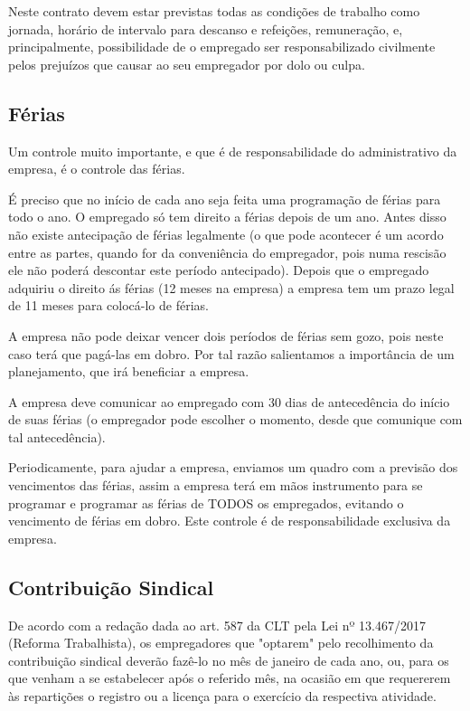 \documentclass{article}
\begin{document}
Neste contrato devem estar previstas todas as condições de trabalho como jornada, horário de intervalo para descanso e refeições, remuneração, e, principalmente, possibilidade de o empregado ser responsabilizado civilmente pelos prejuízos que causar ao seu empregador por dolo ou culpa.

\subsection{Férias}
Um controle muito importante, e que é de responsabilidade do administrativo da empresa, é o controle das férias. 

É preciso que no início de cada ano seja feita uma programação de férias para todo o ano. O empregado só tem direito a férias depois de um ano. Antes disso não existe antecipação de férias legalmente (o que pode acontecer é um acordo entre as partes, quando for da conveniência do empregador, pois numa rescisão ele não poderá descontar este período antecipado).  Depois que o empregado adquiriu o direito ás férias (12 meses na empresa) a empresa tem um prazo legal de 11 meses para colocá-lo de férias.  

A empresa não pode deixar vencer dois períodos de férias sem gozo, pois neste caso terá que pagá-las em dobro. Por tal razão salientamos a importância de um planejamento, que irá beneficiar a empresa. 

A empresa deve comunicar ao empregado com 30 dias de antecedência do início de suas férias (o empregador pode escolher o momento, desde que comunique com tal antecedência).

\begin{tcolorbox}[title=Atenção!]
  Periodicamente, para ajudar a empresa, enviamos um quadro com a previsão dos vencimentos das férias, assim a empresa terá em mãos instrumento para se programar e programar as férias de TODOS os empregados, evitando o vencimento de férias em dobro. Este controle é de responsabilidade exclusiva da empresa.
\end{tcolorbox}

\subsection{Contribuição Sindical}
\label{ins:sindical}
De acordo com a redação dada ao art. 587 da CLT pela Lei nº 13.467/2017 (Reforma Trabalhista), os empregadores que "optarem" pelo recolhimento da contribuição sindical deverão fazê-lo no mês de janeiro de cada ano, ou, para os que venham a se estabelecer após o referido mês, na ocasião em que requererem às repartições o registro ou a licença para o exercício da respectiva atividade.
\end{document}

